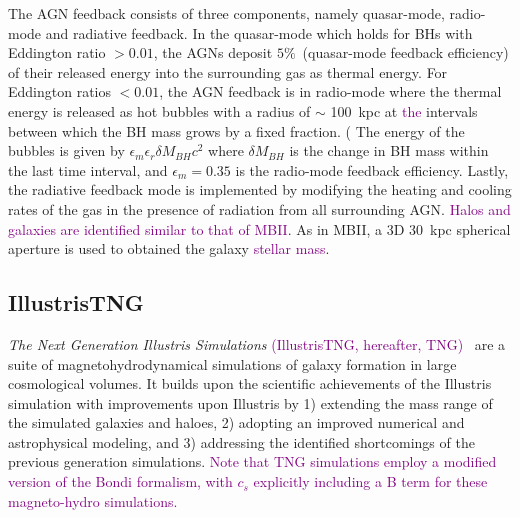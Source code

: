 \documentclass[twocolumn]{aastex631}
\newcommand{\todo}[1]{\textcolor{red}{[{\bf TODO}: #1]}}
\newcommand{\red}[1]{\textcolor{purple}{#1}}
\newcommand{\aklant}[1]{\textcolor{blue}{#1}}
\begin{document}
The AGN feedback consists of three components, namely quasar-mode, radio-mode and radiative feedback. In the quasar-mode which holds for BHs with Eddington ratio $>0.01$, the AGNs deposit $5\%$~(quasar-mode feedback efficiency) of their released energy into the surrounding gas as thermal energy. For Eddington ratios $<0.01$, the AGN feedback is in radio-mode where the thermal energy is released as hot bubbles with a radius of $\sim$ 100~kpc at \red{the} intervals between which the BH mass grows by a fixed fraction. 
(%
The energy of the bubbles is given by $\epsilon_m \epsilon_r \delta M_{BH} c^2$ where $\delta M_{BH}$ is the change in BH mass within the last time interval, and $\epsilon_m=0.35$ is the radio-mode feedback efficiency. Lastly, the radiative feedback mode is implemented by modifying the heating and cooling rates of the gas in the presence of radiation from all surrounding AGN. \red{Halos and galaxies are identified similar to that of MBII}. As in MBII, a 3D 30~kpc spherical aperture is used to obtained the galaxy \red{stellar mass}. %


\subsection{IllustrisTNG}
{\it The Next Generation Illustris Simulations} \red{(IllustrisTNG, hereafter, TNG)~\citep{2018MNRAS.475..676S, Pillepich2018, Naiman2018, Marinacci2018, Nelson2018}} are a suite of magnetohydrodynamical simulations of galaxy formation in large cosmological volumes. It builds upon the scientific achievements of the Illustris simulation with improvements upon Illustris by 1) extending the mass range of the simulated galaxies and haloes, 2) adopting an improved numerical and astrophysical modeling, and 3) addressing the identified shortcomings of the previous generation simulations. \red{Note that TNG simulations employ a modified version of the Bondi formalism, with $c_s$ explicitly including a B term for these magneto-hydro simulations.}
\end{document}
